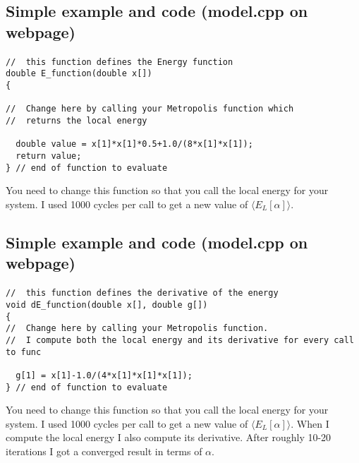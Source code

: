 \documentclass[%
twoside,                 %
final,                   %
10pt]{article}
\begin{document}
\subsection*{Simple example and code (model.cpp on webpage)}

\paragraph{}
\begin{verbatim}
//  this function defines the Energy function
double E_function(double x[])
{

//  Change here by calling your Metropolis function which 
//  returns the local energy

  double value = x[1]*x[1]*0.5+1.0/(8*x[1]*x[1]);
  return value;
} // end of function to evaluate
\end{verbatim}
You need to change this function so that you call the local energy for your system. I used 1000
cycles per call to get a new value of $\langle E_L[\alpha]\rangle$.



\subsection*{Simple example and code (model.cpp on webpage)}

\paragraph{}
\begin{verbatim}
//  this function defines the derivative of the energy 
void dE_function(double x[], double g[])
{
//  Change here by calling your Metropolis function. 
//  I compute both the local energy and its derivative for every call to func

  g[1] = x[1]-1.0/(4*x[1]*x[1]*x[1]);
} // end of function to evaluate
\end{verbatim}
You need to change this function so that you call the local energy for your system. I used 1000
cycles per call to get a new value of $\langle E_L[\alpha]\rangle$.
When I compute the local energy I also compute its derivative.
After roughly 10-20 iterations I got a converged result in terms of $\alpha$.





\printindex
\end{document}
